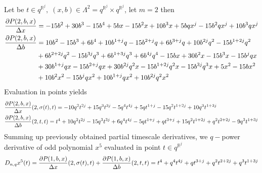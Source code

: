 \begin{examp}
    \label{time_scale_pure_quantum_power_example_2}
    Let be $t\in q^{\mathbb{R}^j}, \; (x,b) \in\Lambda^2 = q^{\mathbb{R}^j} \times q^{\mathbb{R}^j}$, let $m=2$ then
    \begin{align*}
        \frac{\partial P ( 2, b, x )}{\Delta x}
        &= -15 b^2 + 30 b^3 - 15 b^4 + 5 b x - 15 b^2 x + 10 b^3 x + 5 b q x^j - 15 b^2 q x^j + 10 b^3 q x^j \\
        \frac{\partial P ( 2, b, x )}{\Delta b}
        &= 10 b^2 - 15 b^3 + 6 b^4 + 10 b^{1 + j} q - 15 b^{2 + j} q + 6 b^{3 + j} q + 10 b^{2 j} q^2 - 15 b^{1 + 2 j} q^2 \\
        &+ 6 b^{2 + 2 j} q^2 - 15 b^{3 j} q^3 + 6 b^{1 + 3 j} q^3 + 6 b^{4 j} q^4 - 15 b x + 30 b^2 x - 15 b^3 x - 15 b^j q x \\
        &+ 30 b^{1 + j} q x - 15 b^{2 + j} q x + 30 b^{2 j} q^2 x - 15 b^{1 + 2 j} q^2 x - 15 b^{3 j} q^3 x + 5 x^2 - 15 b x^2 \\
        &+ 10 b^2 x^2 - 15 b^j q x^2 + 10 b^{1 + j} q x^2 + 10 b^{2 j} q^2 x^2
    \end{align*}
    Evaluation in points yields
    \begin{align*}
        &\frac{\partial P ( 2, b, x )}{\Delta x} (2, \sigma(t), t)
        = -10 q^2 t^{2 j} + 15 q^3 t^{3 j} - 5 q^4 t^{4 j} + 5 q t^{1 + j} - 15 q^2 t^{1 + 2 j} + 10 q^3 t^{1 + 3 j} \\
        &\frac{\partial P ( 2, b, x )}{\Delta b} (2, t, t)
        = t^4 + 10 q^2 t^{2 j} - 15 q^3 t^{3 j} + 6 q^4 t^{4 j} - 5 q t^{1 + j} + q t^{3 + j} + 15 q^2 t^{1 + 2 j}
        + q^2 t^{2 + 2 j} - 9 q^3 t^{1 + 3 j}
    \end{align*}
    Summing up previously obtained partial timescale derivatives, we $q-$power derivative of odd polynomial
    $x^{5}$ evaluated in point $t\in q^{\mathbb{R}^j}$
    \begin{align*}
        D_{n,q} x^{5} (t)
        = \frac{\partial P ( 1, b, x )}{\Delta x} (2, \sigma(t), t)
        + \frac{\partial P ( 1, b, x )}{\Delta b} (2, t, t)
        = t^4 + q^4 t^{4 j} + q t^{3 + j} + q^2 t^{2 + 2 j} + q^3 t^{1 + 3 j}
    \end{align*}
\end{examp}
